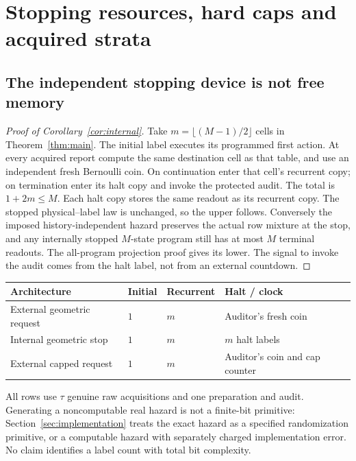 \section{Stopping resources, hard caps and acquired strata}\label{sec:stop-strata}
\subsection{The independent stopping device is not free memory}
\begin{proof}[Proof of Corollary~\ref{cor:internal}]
Take $m=\lfloor(M-1)/2\rfloor$ cells in Theorem~\ref{thm:main}. The initial label executes its programmed first action. At every acquired report compute the same destination cell as that table, and use an independent fresh Bernoulli coin. On continuation enter that cell's recurrent copy; on termination enter its halt copy and invoke the protected audit. The total is $1+2m\le M$. Each halt copy stores the same readout as its recurrent copy. The stopped physical--label law is unchanged, so the upper follows. Conversely the imposed history-independent hazard preserves the actual row mixture at the stop, and any internally stopped $M$-state program still has at most $M$ terminal readouts. The all-program projection proof gives its lower. The signal to invoke the audit comes from the halt label, not from an external countdown.
\end{proof}

\begin{center}
\begin{tabular}{llll}
\toprule
Architecture & Initial & Recurrent & Halt / clock\\
\midrule
External geometric request & $1$ & $m$ & Auditor's fresh coin\\
Internal geometric stop & $1$ & $m$ & $m$ halt labels\\
External capped request & $1$ & $m$ & Auditor's coin and cap counter\\
\bottomrule
\end{tabular}
\end{center}
All rows use $\tau$ genuine raw acquisitions and one preparation and audit. Generating a noncomputable real hazard is not a finite-bit primitive: Section~\ref{sec:implementation} treats the exact hazard as a specified randomization primitive, or a computable hazard with separately charged implementation error. No claim identifies a label count with total bit complexity.

